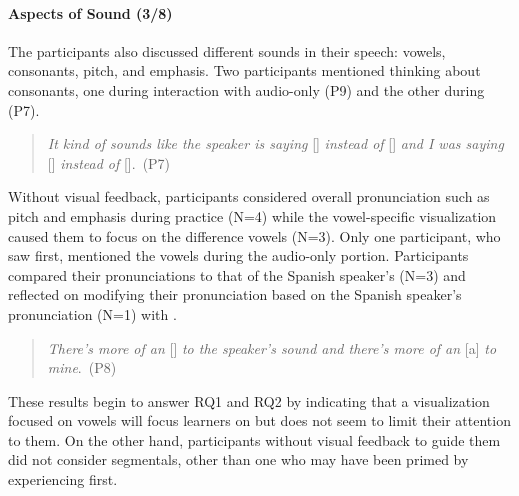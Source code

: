 \paragraph{Aspects of Sound (3/8)}
The participants also discussed different sounds in their speech: vowels, consonants, pitch, and emphasis. Two participants mentioned thinking about consonants, one during interaction with audio-only (P9) and the other during \visowel{} (P7). 

\begin{quote}
    \textit{It kind of sounds like the speaker is saying} [\textsl{}] \textit{instead of} [] \textit{and I was saying} [] \textit{instead of} [].~(P7)
\end{quote} 

Without visual feedback, participants considered overall pronunciation such as pitch and emphasis during practice (N=4) while the vowel-specific visualization caused them to focus on the difference vowels (N=3). Only one participant, who saw \visowel{} first, mentioned the vowels during the audio-only portion. Participants compared their pronunciations to that of the Spanish speaker's (N=3) and reflected on modifying their pronunciation based on the Spanish speaker's pronunciation (N=1) with \visowel{}. 
\begin{quote}
    \textit{There's more of an} [] \textit{to the speaker's sound and there's more of an} [a] \textit{to mine}.~(P8)
\end{quote}
These results begin to answer RQ1 and RQ2 by indicating that a visualization focused on vowels will focus learners on but does not seem to limit their attention to them. On the other hand, participants without visual feedback to guide them did not consider segmentals, other than one who may have been primed by experiencing \visowel{} first.


